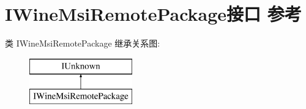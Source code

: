 \hypertarget{interface_i_wine_msi_remote_package}{}\section{I\+Wine\+Msi\+Remote\+Package接口 参考}
\label{interface_i_wine_msi_remote_package}
类 I\+Wine\+Msi\+Remote\+Package 继承关系图\+:\begin{figure}[H]
\begin{center}
\leavevmode
\includegraphics[height=2.000000cm]{interface_i_wine_msi_remote_package}
\end{center}
\end{figure}
